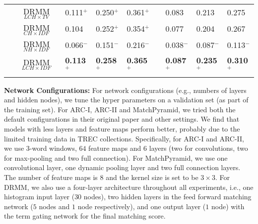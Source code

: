 \documentclass{sig-alternate-05-2015}
\begin{document}
\begin{table*}[!ht]
\begin{tabular}{c c l l l l l l l}
    &DRMM$_{LCH\times TV}$ & 0.111$^+$ & 0.250$^+$ & 0.361$^+$ & & 0.083 & 0.213 & 0.275  \\
    &DRMM$_{CH\times IDF}$ & 0.104 & 0.252$^+$ & 0.354$^+$ & & 0.077 & 0.204 & 0.267 \\
    &DRMM$_{NH\times IDF}$ & 0.066$^-$ & 0.151$^-$ & 0.216$^-$ & & 0.038$^-$ & 0.087$^-$ & 0.113$^-$ \\
    &DRMM$_{LCH\times IDF}$ & \textbf{0.113}$^+$ & \textbf{0.258}$^+$ & \textbf{0.365}$^+$ & & \textbf{0.087}$^+$ & \textbf{0.235}$^+$ & \textbf{0.310}$^+$ \\\hline\hline\\
  \end{tabular}
  \label{tab:rank_result}
\end{table*}


\textbf{Network Configurations:} For network configurations (e.g., numbers of layers and hidden nodes), we tune the hyper parameters on a validation set (as part of the training set). For ARC-I, ARC-II and MatchPyramid, we tried both the default configurations in their original paper and other settings. We find that models with less layers and feature maps perform better, probably due to the limited training data in TREC collections. Specifically, for ARC-I and ARC-II, we use $3$-word windows, $64$ feature maps and $6$ layers (two for convolutions, two for max-pooling and two full connection). For MatchPyramid, we use one convolutional layer, one dynamic pooling layer and two full connection layers. The number of feature maps is $8$ and the kernel size is set to be $3\times 3$. For DRMM, we also use a four-layer architecture throughout all experiments, i.e., one histogram input layer ($30$ nodes), two hidden layers in the feed forward matching network ($5$ nodes and $1$ node respectively), and one output layer ($1$ node) with the term gating network for the final matching score.
\end{document}
